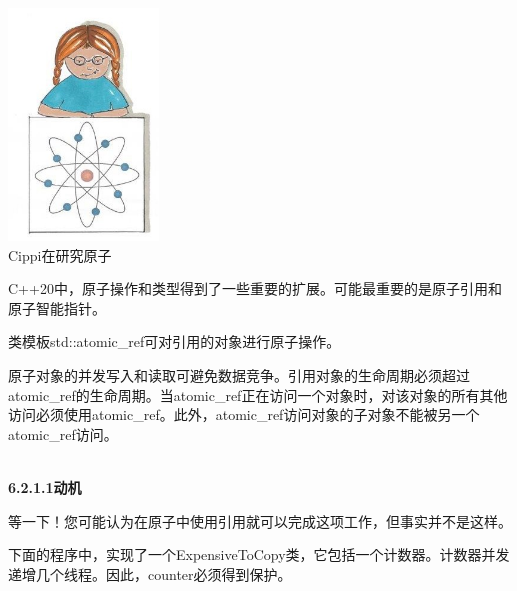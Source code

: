 \begin{center}
\includegraphics[width=0.3\textwidth]{content/3/chapter6/images/7.png}\\
Cippi在研究原子
\end{center}

C++20中，原子操作和类型得到了一些重要的扩展。可能最重要的是原子引用和原子智能指针。


类模板std::atomic\_ref可对引用的对象进行原子操作。

原子对象的并发写入和读取可避免数据竞争。引用对象的生命周期必须超过atomic\_ref的生命周期。当atomic\_ref正在访问一个对象时，对该对象的所有其他访问必须使用atomic\_ref。此外，atomic\_ref访问对象的子对象不能被另一个atomic\_ref访问。

\hspace*{\fill} \\ %
\noindent
\textbf{6.2.1.1\hspace{0.2cm}动机}

等一下！您可能认为在原子中使用引用就可以完成这项工作，但事实并不是这样。

下面的程序中，实现了一个ExpensiveToCopy类，它包括一个计数器。计数器并发递增几个线程。因此，counter必须得到保护。

